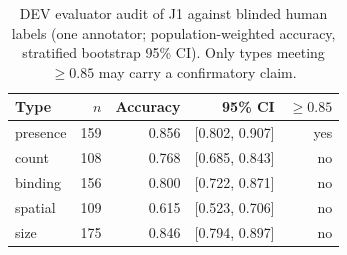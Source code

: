\begin{table}[t]
\centering\small
\caption{DEV evaluator audit of J1 against blinded human labels (one annotator; population-weighted accuracy, stratified bootstrap 95\% CI). Only types meeting $\geq 0.85$ may carry a confirmatory claim.}
\label{tab:dev-audit}
\begin{tabular}{lrrrr}
\toprule
Type & $n$ & Accuracy & 95\% CI & $\geq 0.85$ \\
\midrule
presence & 159 & 0.856 & [0.802, 0.907] & yes \\
count & 108 & 0.768 & [0.685, 0.843] & no \\
binding & 156 & 0.800 & [0.722, 0.871] & no \\
spatial & 109 & 0.615 & [0.523, 0.706] & no \\
size & 175 & 0.846 & [0.794, 0.897] & no \\
\bottomrule
\end{tabular}
\end{table}
